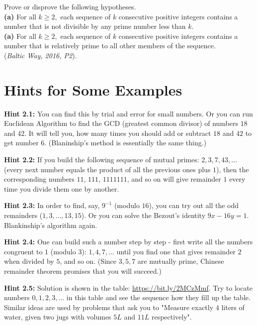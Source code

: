 \documentclass[jou]{apa6}
\begin{document}
\begin{problem}
Prove or disprove the following hypotheses.\\
{\bf (a)} For all $k \geq  2,$ each sequence of $k$ consecutive positive integers contains a number that is not divisible by any prime number less than $k$.\\
{\bf (a)} For all $k\geq 2,$ each sequence of $k$ consecutive positive integers contains a number that is relatively prime to all other members of the sequence.\\
({\em Baltic Way, 2016, P2}). 
\end{problem}

\newpage

\section{Hints for Some Examples}

{\bf Hint 2.1:} You can find this by trial and error for small numbers. 
Or you can run Euclidean Algorithm to find the GCD (greatest common divisor) 
of numbers $18$ and $42$. It will tell you, how many times you should add 
or subtract $18$ and $42$ to get number $6$. (Blaninship's method is essentially 
the same thing.)

{\bf Hint 2.2:} If you build the following sequence of mutual primes:
$2,3,7,43,\ldots$ (every next number equals the product of all the previous ones plus $1$), 
then the corresponding numbers $11$, $111$, $1111111$, and so on will give remainder $1$
every time you divide them one by another.

{\bf Hint 2.3:} In order to find, say, $9^{-1}$ (modulo $16$), you can 
try out all the odd remainders ($1,3,\ldots,13,15$). Or you can solve the
Bezout's identity $9x - 16y = 1$. Blankinship's algorithm again.

{\bf Hint 2.4:} One can build such a number step by step - 
first write all the numbers congruent to $1$ (modulo $3$): 
$1,4,7,\ldots$ until you find one that gives remainder $2$ when 
divided by $5$, and so on. (Since $3,5,7$ are mutually prime, 
Chinese remainder theorem promises that you will succeed.)

{\bf Hint 2.5:} Solution is shown in the table: \url{https://bit.ly/2MCzMmf}. 
Try to locate numbers
$0,1,2,3,\ldots$ in this table and see the sequence how they fill up the table. 
Similar ideas are used by problems that ask you to "Measure exactly $4$ liters
of water, given two jugs with volumes $5L$ and $11L$ respectively". 
\end{document}
